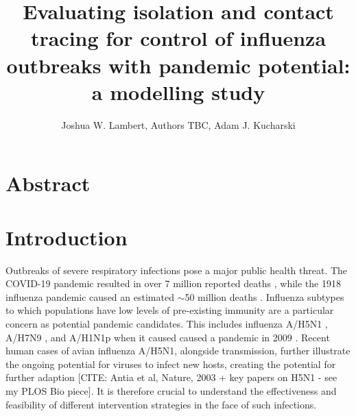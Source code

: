 \documentclass{article}
\title{Evaluating isolation and contact tracing for control of influenza outbreaks with pandemic potential: a modelling study}
\author{Joshua W. Lambert, Authors TBC, Adam J. Kucharski}
\date{}
\begin{document}
\maketitle

\section*{Abstract}

\section*{Introduction}

Outbreaks of severe respiratory infections pose a major public health threat. The COVID-19 pandemic resulted in over 7 million reported deaths \citep{whocovid-19dashboardCOVID19DeathsWHO}, while the 1918 influenza pandemic caused an estimated $\sim$50 million deaths \citep{johnsonUpdatingAccountsGlobal2002}. 
Influenza subtypes to which populations have low levels of pre-existing immunity are a particular concern as potential pandemic candidates. This includes influenza A/H5N1 \citep{Ward2024.12.11.24318702}, A/H7N9 \citep{tannerPandemicPotentialAvian2015}, and A/H1N1p when it caused caused a pandemic in 2009 \citep{fraserPandemicPotentialStrain2009}. Recent human cases of avian influenza A/H5N1, alongside transmission, further illustrate the ongoing potential for viruses to infect new hosts, creating the potential for further adaption [CITE: Antia et al, Nature, 2003 + key papers on H5N1 - see my PLOS Bio piece]. It is therefore crucial to understand the effectiveness and feasibility of different intervention strategies in the face of such infections.

\end{document}
